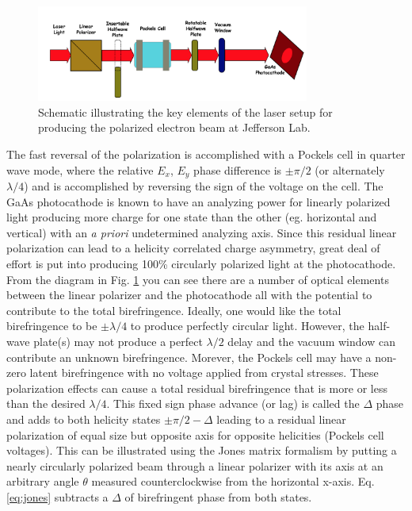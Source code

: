 \documentclass[12pt]{article}
\begin{document}
\begin{figure}[hb]
\begin{center}
\includegraphics[width=0.8\textwidth]{laser_schematic.png}
\caption{\label{fig:laser_schematic} Schematic illustrating the key elements of the laser setup for producing the polarized electron beam at Jefferson Lab.}
\end{center}
\end{figure}
The fast reversal of the polarization is accomplished with a Pockels cell in quarter wave mode, where the relative $E_x$, $E_y$ phase difference is $\pm\pi/2$ (or alternately $\lambda/4$) and is accomplished by reversing the sign of the voltage on the cell. The GaAs photocathode is known to have an analyzing power for linearly polarized light producing more charge for one state than the other (eg. horizontal and vertical) with an {\it a priori} undetermined analyzing axis. Since this residual linear polarization can lead to a helicity correlated charge asymmetry, great deal of effort is put into producing 100\% circularly polarized light at the photocathode. From the diagram in Fig. \ref{fig:laser_schematic} you can see there are a number of optical elements between the linear polarizer and the photocathode all with the potential to contribute to the total birefringence. Ideally, one would like the total birefringence to be $\pm\lambda/4$ to produce perfectly circular light. However, the half-wave plate(s) may not produce a perfect $\lambda/2$ delay and the vacuum window can contribute an unknown birefringence. Morever, the Pockels cell may have a non-zero latent birefringence with no voltage applied from crystal stresses. These polarization effects can cause a total residual birefringence that is more or less than the desired $\lambda/4$. This fixed sign phase advance (or lag) is called the $\Delta$ phase and adds to both helicity states $\pm\pi/2-\Delta$ leading to a residual linear polarization of equal size but opposite axis for opposite helicities (Pockels cell voltages). This can be illustrated using the Jones matrix formalism by putting a nearly circularly polarized beam through a linear polarizer with its axis at an arbitrary angle $\theta$ measured counterclockwise from the horizontal x-axis. Eq. \ref{eq:jones} subtracts a $\Delta$ of birefringent phase from both states.
\end{document}
